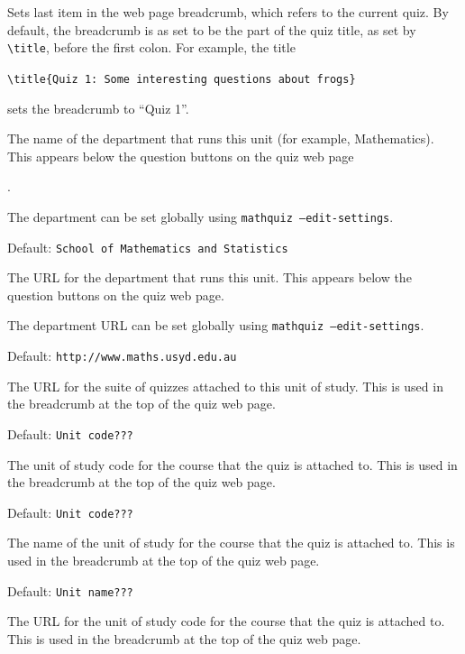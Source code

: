 \documentclass[svgnames]{article}
\begin{document}
\begin{description}
  \item[$\backslash$BreadCrumb]
     Sets last item in the web page breadcrumb, which refers to the
     current quiz. By default, the breadcrumb is as set to be the
     part of the quiz title, as set by \verb!\title!,
     before the first colon. For example, the title

     \hspace*{20mm}\verb!\title{Quiz 1: Some interesting questions about frogs}!

     sets the breadcrumb to ``Quiz 1''.

  \item[$\backslash$Department]
    The name of the department that runs this unit (for example,
    Mathematics). This appears below the question buttons on the quiz web
    page{.

    The department can be set globally using \texttt{mathquiz --edit-settings}.

    Default: \texttt{School of Mathematics and Statistics}

  \item[$\backslash$DepartmentURL]
    The URL for the department that runs this unit. This appears below
    the question buttons on the quiz web page.

    The department URL can be set globally using \texttt{mathquiz --edit-settings}.

    Default: \texttt{http://www.maths.usyd.edu.au}

  \item[$\backslash$QuizzesURL]
    The URL for the suite of quizzes attached to this unit of study. This
    is used in the breadcrumb at the top of the quiz web page.

    Default: \texttt{Unit code???}

  \item[$\backslash$UnitCode]
    The unit of study code for the course that the quiz is attached
    to. This is used in the breadcrumb at the top of the quiz web page.

    Default: \texttt{Unit code???}

  \item[$\backslash$UnitName]
    The name of the unit of study for the course that the quiz is attached
    to. This is used in the breadcrumb at the top of the quiz web page.

    Default: \texttt{Unit name???}

  \item[$\backslash$UnitURL]
    The URL for the unit of study code for the course that the quiz is attached
    to. This is used in the breadcrumb at the top of the quiz web page.

}
\end{description}
\end{document}
